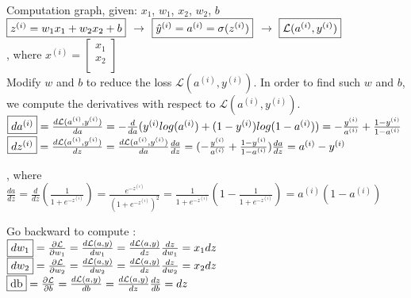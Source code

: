 \documentclass{article}
\begin{document}
Computation graph, given: $x_1$, $w_1$, $x_2$, $w_2$, $b$\\

$\fbox{$z^{(i)} = w_1 x_1 + w_2 x_2 +b$}$
$\rightarrow$
$\fbox{$\hat y^{(i)} = a^{(i)} = \sigma(z^{(i)})$}$
$\rightarrow$
$\fbox{$\mathcal{L}(a^{(i)},y^{(i)})$}$\\

, where $x^{(i)}= \begin{bmatrix}
x_1\\
x_2\\
\end{bmatrix}$\\

Modify $w$ and $b$ to reduce the loss $\mathcal{L}(a^{(i)},y^{(i)})$. In order to find such $w$ and $b$, we compute the derivatives with respect to $\mathcal{L}(a^{(i)},y^{(i)})$.\\

$\fbox{$da^{(i)}$}= \frac{d\mathcal{L}(a^{(i)},y^{(i)})}{da} = -\frac{d}{da} (y^{(i)}log(a^{(i)}) + (1-y^{(i)})log(1-a^{(i)})) = -\frac{y^{(i)}}{a^{(i)}} + \frac{1-y^{(i)}}{1-a^{(i)}}$\\

$\fbox{$dz^{(i)}$} = \frac{d\mathcal{L}(a^{(i)},y^{(i)})}{dz} = \frac{d\mathcal{L}(a^{(i)},y^{(i)})}{da} \frac{da}{dz} = (-\frac{y^{(i)}}{a^{(i)}}+\frac{1-y^{(i)}}{1-a^{(i)}})\frac{da}{dz}= a^{(i)}-y^{(i)}$

, where $\frac{da}{dz} = \frac{d}{dz}(\frac{1}{1+e^{-z^{(i)}}}) = \frac{e^{-z^{(i)}}}{(1+e^{-z^{(i)}})^2} = \frac{1}{1+e^{-z^{(i)}}}(1-\frac{1}{1+e^{-z^{(i)}}})= a^{(i)}(1-a^{(i)})$\\

\newpage

Go backward to compute :\\

$\fbox{$dw_1$} = \frac{\partial \mathcal{L}}{\partial w_1} =\frac{d\mathcal{L}(a,y)}{dw_1} =\frac{d\mathcal{L}(a,y)}{dz} \frac{dz}{dw_1}= x_1 dz$\\

$\fbox{$dw_2$} = \frac{\partial \mathcal{L}}{\partial w_2} =\frac{d\mathcal{L}(a,y)}{dw_2} =\frac{d\mathcal{L}(a,y)}{dz} \frac{dz}{dw_2}= x_2 dz$\\

$\fbox{db} = \frac{\partial \mathcal{L}}{\partial b} =\frac{d\mathcal{L}(a,y)}{db} =\frac{d\mathcal{L}(a,y)}{dz} \frac{dz}{db}= dz$\\\\
\end{document}
